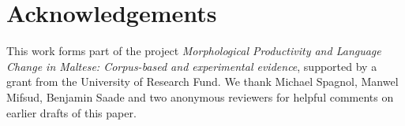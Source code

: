 \documentclass[output=paper]{LSP/langsci}
\begin{document}
\section*{Acknowledgements}
This work forms part of the project \textit{Morphological Productivity and Language Change in Maltese: Corpus-based and experimental evidence}, supported by a grant from the University of  Research Fund. We thank Michael Spagnol, Manwel Mifsud, Benjamin Saade and two anonymous reviewers for helpful comments on earlier drafts of this paper.

\sloppy
%
\printbibliography[heading=subbibliography,notkeyword=this] 
\end{document}
